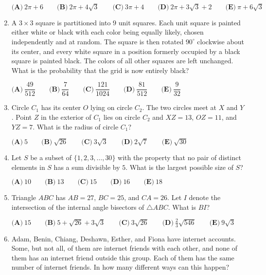 \documentclass{article}
\begin{document}
\begin{enumerate}[label=\arabic*., itemsep=0.5em]
\( \textbf{(A)}\ 2\pi+6\qquad\textbf{(B)}\ 2\pi+4\sqrt3 \qquad\textbf{(C)}\ 3\pi+4 \qquad\textbf{(D)}\ 2\pi+3\sqrt3+2 \qquad\textbf{(E)}\ \pi+6\sqrt3 \)\par \vspace{0.5em}\item A \(3\times3\) square is partitioned into \(9\) unit squares.  Each unit square is painted either white or black with each color being equally likely, chosen independently and at random.  The square is then rotated \(90^\circ\) clockwise about its center, and every white square in a position formerly occupied by a black square is painted black.  The colors of all other squares are left unchanged.  What is the probability that the grid is now entirely black?

\( \textbf{(A)}\ \dfrac{49}{512}
\qquad\textbf{(B)}\ \dfrac{7}{64}
\qquad\textbf{(C)}\ \dfrac{121}{1024}
\qquad\textbf{(D)}\ \dfrac{81}{512}
\qquad\textbf{(E)}\ \dfrac{9}{32}
 \)\par \vspace{0.5em}\item Circle \(C_1\) has its center \(O\) lying on circle \(C_2\).  The two circles meet at \(X\) and \(Y\).  Point \(Z\) in the exterior of \(C_1\) lies on circle \(C_2\) and \(XZ=13\), \(OZ=11\), and \(YZ=7\).  What is the radius of circle \(C_1\)?

\( \textbf{(A)}\ 5\qquad\textbf{(B)}\ \sqrt{26}\qquad\textbf{(C)}\ 3\sqrt{3}\qquad\textbf{(D)}\ 2\sqrt{7}\qquad\textbf{(E)}\ \sqrt{30} \)\par \vspace{0.5em}\item Let \(S\) be a subset of \(\{1,2,3,\dots,30\}\) with the property that no pair of distinct elements in \(S\) has a sum divisible by \(5\).  What is the largest possible size of \(S\)?

\( \textbf{(A)}\ 10\qquad\textbf{(B)}\ 13\qquad\textbf{(C)}\ 15\qquad\textbf{(D)}\ 16\qquad\textbf{(E)}\ 18 \)\par \vspace{0.5em}\item Triangle \(ABC\) has \(AB=27\), \(BC=25\), and \(CA=26\).  Let \(I\) denote the intersection of the internal angle bisectors of \(\triangle ABC\).  What is \(BI\)?

\( \textbf{(A)}\ 15\qquad\textbf{(B)}\ 5+\sqrt{26}+3\sqrt{3}\qquad\textbf{(C)}\ 3\sqrt{26}\qquad\textbf{(D)}\ \frac{2}{3}\sqrt{546}\qquad\textbf{(E)}\ 9\sqrt{3} \)\par \vspace{0.5em}\item Adam, Benin, Chiang, Deshawn, Esther, and Fiona have internet accounts.  Some, but not all, of them are internet friends with each other, and none of them has an internet friend outside this group.  Each of them has the same number of internet friends.  In how many different ways can this happen?


\end{enumerate}
\end{document}
